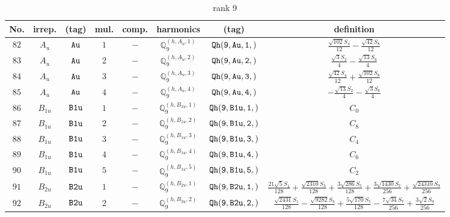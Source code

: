 \documentclass[fleqn,8pt]{jsarticle}
\begin{document}
\begin{table}[ht!]
\begin{center}
\caption{rank 9}
\renewcommand{\arraystretch}{1.3}
\begin{tabular}{cccccccc} \hline \hline
No. & irrep. & (tag) & mul. & comp. & harmonics & (tag) & definition \\ \hline
$ 82 $ & $ A_{u} $ & $ {\tt Au} $ & $ 1 $ & $ - $ & $ \mathbb{Q}_{9}^{(h,A_{u},1)} $ & $ {\tt Qh(9,Au,1,)} $ & $ \frac{\sqrt{102} S_{4}}{12} - \frac{\sqrt{42} S_{8}}{12} $ \\
$ 83 $ & $ A_{u} $ & $ {\tt Au} $ & $ 2 $ & $ - $ & $ \mathbb{Q}_{9}^{(h,A_{u},2)} $ & $ {\tt Qh(9,Au,2,)} $ & $ \frac{\sqrt{3} S_{2}}{4} - \frac{\sqrt{13} S_{6}}{4} $ \\
$ 84 $ & $ A_{u} $ & $ {\tt Au} $ & $ 3 $ & $ - $ & $ \mathbb{Q}_{9}^{(h,A_{u},3)} $ & $ {\tt Qh(9,Au,3,)} $ & $ \frac{\sqrt{42} S_{4}}{12} + \frac{\sqrt{102} S_{8}}{12} $ \\
$ 85 $ & $ A_{u} $ & $ {\tt Au} $ & $ 4 $ & $ - $ & $ \mathbb{Q}_{9}^{(h,A_{u},4)} $ & $ {\tt Qh(9,Au,4,)} $ & $ - \frac{\sqrt{13} S_{2}}{4} - \frac{\sqrt{3} S_{6}}{4} $ \\
$ 86 $ & $ B_{1u} $ & $ {\tt B1u} $ & $ 1 $ & $ - $ & $ \mathbb{Q}_{9}^{(h,B_{1u},1)} $ & $ {\tt Qh(9,B1u,1,)} $ & $ C_{0} $ \\
$ 87 $ & $ B_{1u} $ & $ {\tt B1u} $ & $ 2 $ & $ - $ & $ \mathbb{Q}_{9}^{(h,B_{1u},2)} $ & $ {\tt Qh(9,B1u,2,)} $ & $ C_{8} $ \\
$ 88 $ & $ B_{1u} $ & $ {\tt B1u} $ & $ 3 $ & $ - $ & $ \mathbb{Q}_{9}^{(h,B_{1u},3)} $ & $ {\tt Qh(9,B1u,3,)} $ & $ C_{4} $ \\
$ 89 $ & $ B_{1u} $ & $ {\tt B1u} $ & $ 4 $ & $ - $ & $ \mathbb{Q}_{9}^{(h,B_{1u},4)} $ & $ {\tt Qh(9,B1u,4,)} $ & $ C_{6} $ \\
$ 90 $ & $ B_{1u} $ & $ {\tt B1u} $ & $ 5 $ & $ - $ & $ \mathbb{Q}_{9}^{(h,B_{1u},5)} $ & $ {\tt Qh(9,B1u,5,)} $ & $ C_{2} $ \\
$ 91 $ & $ B_{2u} $ & $ {\tt B2u} $ & $ 1 $ & $ - $ & $ \mathbb{Q}_{9}^{(h,B_{2u},1)} $ & $ {\tt Qh(9,B2u,1,)} $ & $ \frac{21 \sqrt{5} S_{1}}{128} + \frac{\sqrt{2310} S_{3}}{128} + \frac{3 \sqrt{286} S_{5}}{128} + \frac{3 \sqrt{1430} S_{7}}{256} + \frac{\sqrt{24310} S_{9}}{256} $ \\
$ 92 $ & $ B_{2u} $ & $ {\tt B2u} $ & $ 2 $ & $ - $ & $ \mathbb{Q}_{9}^{(h,B_{2u},2)} $ & $ {\tt Qh(9,B2u,2,)} $ & $ \frac{\sqrt{2431} S_{1}}{128} - \frac{\sqrt{9282} S_{3}}{128} + \frac{5 \sqrt{170} S_{5}}{128} - \frac{7 \sqrt{34} S_{7}}{256} + \frac{3 \sqrt{2} S_{9}}{256} $ \\

\end{tabular}
\end{center}
\end{table}
\end{document}

